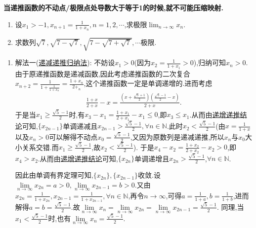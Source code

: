 \documentclass[../../main.tex]{subfiles}%
\begin{document}
\begin{remark}
\textbf{当递推函数的不动点/极限点处导数大于等于1的时候,就不可能压缩映射.}
\end{remark}



\begin{example}
\begin{enumerate}
\item 设\(x_1 > - 1,x_{n + 1} = \frac{1}{1 + x_n},n = 1,2,\cdots\),求极限\(\lim_{n \to \infty} x_n\).
\item 求数列\(\sqrt{7},\sqrt{7 - \sqrt{7}},\sqrt{7 - \sqrt{7 + \sqrt{7}}},\cdots\)极限.
\end{enumerate}
\end{example}
\begin{solution}
\begin{enumerate}
\item 
{\color{blue}解法一(\hyperref[proposition:递减函数递推数列]{递减递推归纳法}):}
不妨设$x_1>0$(因为$x_2=\frac{1}{1+x_1}>0$),归纳可知$x_n>0$.由于原递推函数是递减函数,因此考虑递推函数的二次复合$x_{n+2}=\frac{1}{1+\frac{1}{1+x_n}}=\frac{1+x_n}{2+_n}$,这个递推函数一定是单调递增的.进而考虑
\begin{align*}
\frac{1+x}{2+x}-x=\frac{\left( x+\frac{\sqrt{5}+1}{2} \right) \left( \frac{\sqrt{5}-1}{2}-x \right)}{2+x}.
\end{align*}
于是当$x_1\geqslant  \frac{\sqrt{5}-1}{2}$时,有$x_3-x_1=\frac{1+x_1}{2+x_1}-x_1\leqslant 0$,即$x_3\leqslant x_1$.从而由\hyperref[proposition:递增函数递推数列]{递增递推结论}可知,$\{x_{2n-1}\}$单调递减且$x_{2n-1}>\frac{\sqrt{5}-1}{2},\forall n \in \mathbb{N}$.此时\(x_2<\frac{\sqrt{5}-1}{2}\)(由\(x = \frac{1}{1 + x}\)以及$x_n>0$可以解得不动点\(x_0=\frac{\sqrt{5}-1}{2}\),又因为原数列是递减递推,所以\(x_n\)与\(x_0\)大小关系交错.而\(x_1\geqslant\frac{\sqrt{5}-1}{2}\),故\(x_2<\frac{\sqrt{5}-1}{2}\)).
于是\(x_4 - x_2=\frac{1 + x_2}{2 + x_2}-x_2>0\),即\(x_4>x_2\).从而由\hyperref[proposition:递增函数递推数列]{递增递推结论}可知,\(\{x_{2n}\}\)单调递增且\(x_{2n}>\frac{\sqrt{5}-1}{2}\),\(\forall n\in\mathbb{N}\).

因此由单调有界定理可知,$\{x_{2n}\},\{x_{2n-1}\}$收敛.设$\underset{n\rightarrow \infty}{\lim}x_{2n}=a>0,\underset{n\rightarrow \infty}{\lim}x_{2n-1}=b>0$.又由$x_{2n}=\frac{1}{1+x_{2n}},x_{2n-1}=\frac{1}{1+x_{2n-1}},\forall n\in \mathbb{N}$,再令$n\to \infty$,可得$a=\frac{1}{1+a},b=\frac{1}{1+b}$,进而解得$a=b=\frac{\sqrt{5}-1}{2}$.故$\underset{n\rightarrow \infty}{\lim}x_n=\underset{n\rightarrow \infty}{\lim}x_{2n}=\underset{n\rightarrow \infty}{\lim}x_{2n-1}=\frac{\sqrt{5}-1}{2}$.
同理,当$x_1<\frac{\sqrt{5}-1}{2}$时,也有$\underset{n\rightarrow \infty}{\lim}x_n=\frac{\sqrt{5}-1}{2}$.


\end{enumerate}
\end{solution}
\end{document}
